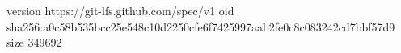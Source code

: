 version https://git-lfs.github.com/spec/v1
oid sha256:a0c58b535bcc25e548c10d2250cfe6f7425997aab2fe0c8c083242cd7bbf57d9
size 349692
